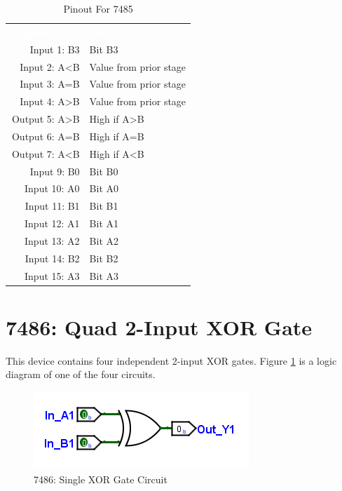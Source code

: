 \begin{table}[H]
	\sffamily
	\newcommand{\head}[1]{\textcolor{white}{\textbf{#1}}}		
	\begin{center}
		\begin{tabular}{rl} 
			\rowcolor{black!75}
			\head{Logisim Label} & \head{Function} \\
			Input 1: B3   & Bit B3                 \\
			Input 2: A<B  & Value from prior stage \\
			Input 3: A=B  & Value from prior stage \\
			Input 4: A>B  & Value from prior stage \\
			Output 5: A>B & High if A>B            \\
			Output 6: A=B & High if A=B            \\
			Output 7: A<B & High if A<B            \\
			Input 9: B0   & Bit B0                 \\
			Input 10: A0  & Bit A0                 \\
			Input 11: B1  & Bit B1                 \\
			Input 12: A1  & Bit A1                 \\
			Input 13: A2  & Bit A2                 \\
			Input 14: B2  & Bit B2                 \\
			Input 15: A3  & Bit A3                 \\
		\end{tabular}
	\end{center}
	\caption{Pinout For 7485}
	\label{tab:50-7485}
\end{table}

\section{7486: Quad 2-Input XOR Gate}

This device contains four independent 2-input XOR gates. Figure \ref{fig:app_ttl-7486} is a logic diagram of one of the four circuits.

\begin{figure}[H]
	\centering
	\includegraphics{gfx/app_ttl-7486}
	\caption{7486: Single XOR Gate Circuit}
	\label{fig:app_ttl-7486}
\end{figure}

